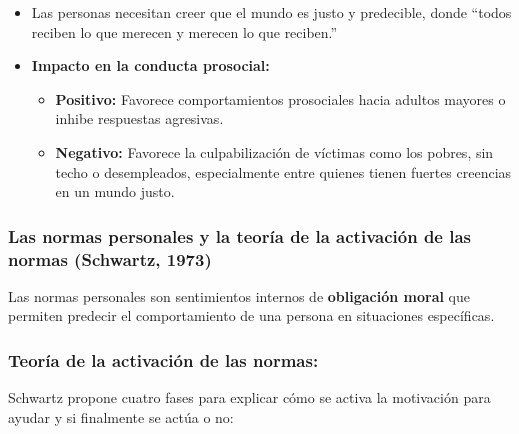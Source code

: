 \documentclass[
]{book}
\providecommand{\tightlist}{%
  \setlength{\itemsep}{0pt}\setlength{\parskip}{0pt}}
\begin{document}
\begin{itemize}
\tightlist
\item
  Las personas necesitan creer que el mundo es justo y predecible, donde ``todos reciben lo que merecen y merecen lo que reciben.''
\item
  \textbf{Impacto en la conducta prosocial:}

  \begin{itemize}
  \tightlist
  \item
    \textbf{Positivo:} Favorece comportamientos prosociales hacia adultos mayores o inhibe respuestas agresivas.
  \item
    \textbf{Negativo:} Favorece la culpabilización de víctimas como los pobres, sin techo o desempleados, especialmente entre quienes tienen fuertes creencias en un mundo justo.
  \end{itemize}
\end{itemize}

\subsubsection{Las normas personales y la teoría de la activación de las normas (Schwartz, 1973)}\label{las-normas-personales-y-la-teoruxeda-de-la-activaciuxf3n-de-las-normas-schwartz-1973}

Las normas personales son sentimientos internos de \textbf{obligación moral} que permiten predecir el comportamiento de una persona en situaciones específicas.

\subsubsection{Teoría de la activación de las normas:}\label{teoruxeda-de-la-activaciuxf3n-de-las-normas}

Schwartz propone cuatro fases para explicar cómo se activa la motivación para ayudar y si finalmente se actúa o no:
\end{document}
